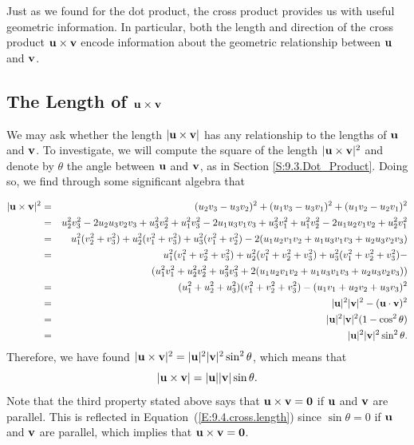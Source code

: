 Just as we found for the dot product, the cross product provides us
with useful geometric information.  In particular, both the length and
direction of the cross product $\mathbf{u}\times\mathbf{v}$ encode information about
the geometric relationship between $\mathbf{u}$ and $\mathbf{v}$.

\subsection*{The Length of $\mathbf{u}\times\mathbf{v}$}

We may ask whether the length $|\mathbf{u}\times\mathbf{v}|$ has any relationship to
the lengths of $\mathbf{u}$ and $\mathbf{v}$.  To investigate, we will compute the
square of the length $|\mathbf{u}\times\mathbf{v}|^2$ and denote by $\theta$ the
angle between $\mathbf{u}$ and $\mathbf{v}$, as in Section \ref{S:9.3.Dot_Product}.
Doing so, we find through some significant algebra that

\begin{eqnarray*}
  |\mathbf{u}\times\mathbf{v}|^2&=&(u_2v_3-u_3v_2)^2 + (u_1v_3-u_3v_1)^2 +
  (u_1v_2-u_2v_1)^2 \\
  &=&
  u_2^2 v_3^2- 2u_2u_3v_2v_3 +u_3^2v_2^2 +
  u_1^2 v_3^2 -2u_1u_3v_1v_3 +u_3^2v_1^2 +
  u_1^2 v_2^2 -2u_1u_2v_1v_2 +u_2^2v_1^2 \\
  &=&
  u_1^2(v_2^2+v_3^2) + u_2^2(v_1^2+v_3^2) + u_3^2(v_1^2+v_2^2) -
  2(u_1u_2v_1v_2 + u_1u_3v_1v_3 + u_2u_3v_2v_3) \\
  & = & 
  u_1^2(v_1^2+v_2^2+v_3^2) + u_2^2(v_1^2+v_2^2+v_3^2) +
  u_3^2(v_1^2+v_2^2+v_3^2) - \\
  & &
  (u_1^2v_1^2 + u_2^2v_2^2 + u_3^2v_3^2  + 
  2(u_1u_2v_1v_2 + u_1u_3v_1v_3 + u_2u_3v_2v_3)) \\
  &=&
  (u_1^2+u_2^2+u_3^2)(v_1^2+v_2^2+v_3^2)-(u_1v_1+u_2v_2+u_3v_3)^2  \\
  &=&
  |\mathbf{u}|^2|\mathbf{v}|^2-(\mathbf{u}\cdot\mathbf{v})^2 \\
  &=&
  |\mathbf{u}|^2|\mathbf{v}|^2(1-\cos^2\theta) \\
  &=&|\mathbf{u}|^2|\mathbf{v}|^2\sin^2\theta. \\
\end{eqnarray*}
Therefore, we have found $|\mathbf{u}\times\mathbf{v}|^2 = |\mathbf{u}|^2|\mathbf{v}|^2\sin^2\theta$,
which means that
\begin{equation}
  \label{E:9.4.cross.length}
  |\mathbf{u}\times\mathbf{v}| = |\mathbf{u}||\mathbf{v}|\sin\theta.
\end{equation}
 Note that the third property stated above says that $\mathbf{u}\times\mathbf{v} = \mathbf{0}$ if
$\mathbf{u}$ and $\mathbf{v}$ are parallel.  This is reflected in
Equation~(\ref{E:9.4.cross.length}) since $\sin\theta=0$ if $\mathbf{u}$ and $\mathbf{v}$ are
parallel, which implies that $\mathbf{u}\times\mathbf{v} = \mathbf{0}$.


